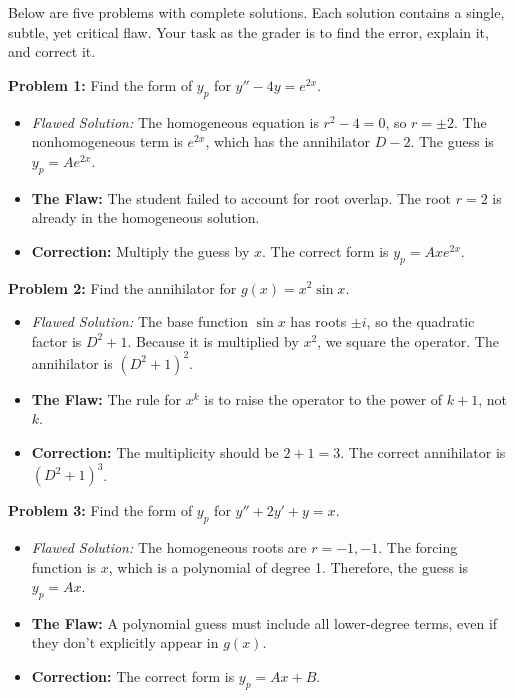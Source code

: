\documentclass[11pt, a4paper]{article}
\theoremstyle{definition}
\theoremstyle{remark}
\begin{document}
Below are five problems with complete solutions. Each solution contains a single, subtle, yet critical flaw. Your task as the grader is to find the error, explain it, and correct it.

\vspace{1em}
\textbf{Problem 1:} Find the form of $y_p$ for $y'' - 4y = e^{2x}$.
\begin{itemize}
    \item \textit{Flawed Solution:} The homogeneous equation is $r^2 - 4 = 0$, so $r = \pm 2$. The nonhomogeneous term is $e^{2x}$, which has the annihilator $D-2$. The guess is $y_p = A e^{2x}$.
    \item \textbf{The Flaw:} The student failed to account for root overlap. The root $r=2$ is already in the homogeneous solution.
    \item \textbf{Correction:} Multiply the guess by $x$. The correct form is $y_p = A x e^{2x}$.
\end{itemize}

\vspace{1em}
\textbf{Problem 2:} Find the annihilator for $g(x) = x^2 \sin x$.
\begin{itemize}
    \item \textit{Flawed Solution:} The base function $\sin x$ has roots $\pm i$, so the quadratic factor is $D^2 + 1$. Because it is multiplied by $x^2$, we square the operator. The annihilator is $(D^2 + 1)^2$.
    \item \textbf{The Flaw:} The rule for $x^k$ is to raise the operator to the power of $k+1$, not $k$.
    \item \textbf{Correction:} The multiplicity should be $2+1=3$. The correct annihilator is $(D^2 + 1)^3$.
\end{itemize}

\vspace{1em}
\textbf{Problem 3:} Find the form of $y_p$ for $y'' + 2y' + y = x$.
\begin{itemize}
    \item \textit{Flawed Solution:} The homogeneous roots are $r = -1, -1$. The forcing function is $x$, which is a polynomial of degree 1. Therefore, the guess is $y_p = Ax$.
    \item \textbf{The Flaw:} A polynomial guess must include all lower-degree terms, even if they don't explicitly appear in $g(x)$.
    \item \textbf{Correction:} The correct form is $y_p = Ax + B$.
\end{itemize}
\end{document}
